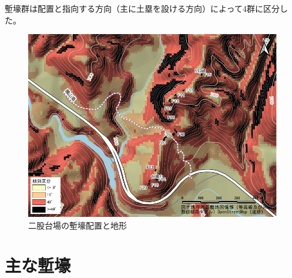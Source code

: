 \documentclass[11pt,report]{jsarticle}
\begin{document}
塹壕群は配置と指向する方向（主に土塁を設ける方向）によって4群に区分した。

\begin{figure}[ht]
\centering
\includegraphics[width=160truemm]{../02fig/03slope.pdf}
\caption{二股台場の塹壕配置と地形}
\label{slope}
\end{figure}

\section{主な塹壕}
\end{document}
